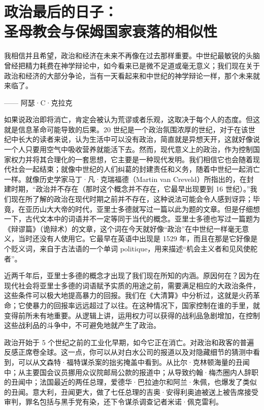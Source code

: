 \chapter[政治最后的日子]{政治最后的日子：\\ 圣母教会与保姆国家衰落的相似性}

\begin{tcolorbox}
我相信并且希望，政治和经济在未来不再像在过去那样重要。中世纪最敏锐的头脑曾经把精力耗费在神学辩论中，如今看来已是微不足道或毫无意义；我们现在关于政治和经济的大部分争论，当有一天看起来和中世纪的神学辩论一样，那个未来就来临了。
\begin{flushright}
—— 阿瑟·C·克拉克
\end{flushright}
\end{tcolorbox}

如果说政治即将消亡，肯定会被认为荒谬或者乐观，这取决于每个人的态度。但这就是信息革命可能导致的后果。20 世纪是一个政治氛围浓厚的世纪，对于在该世纪中长大的读者来说，认为生活中可以没有政治，简直就是异想天开，这就好像说一个人只要用空气中吸收营养就能活下去。然而，现代意义上的政治，作为控制国家权力并将其合理化的一套思想，它主要是一种现代发明。我们相信它也会随着现代社会一起结束；就像中世纪的人们纠葛的封建责任和义务，随着中世纪一起消亡一样。就像历史学家马丁·凡·克瑞福德（Martin van Creveld）所指出的，在封建时期，“政治并不存在（那时这个概念并不存在，它最早出现要到 16 世纪）。”我们现在所了解的政治在现代时期之前并不存在，这种说法可能会令人感到讶异；毕竟，在亚历山大大帝的时代，亚里士多德就写过一篇以此为题的文章。但是仔细想一下，古代文本中的词语并不一定等同于当代的概念。亚里士多德也写过一篇题为《辩谬篇》（诡辩术）的文章，这个词在今天就好像“政治”在中世纪一样毫无意义，当时还没有人使用它。它最早在英语中出现是 1529 年，而且在那是它好像是个贬义词，来自于古法语的一个单词 politique，用来描述“机会主义者和见风使舵者”。

近两千年后，亚里士多德的概念才出现了我们现在所知的内涵。原因何在？因为在现代社会将亚里士多德的词语赋予实质的用途之前，需要满足相应的大政治条件，这些条件可以极大地提高暴力的回报。我们在《大清算》中分析过，这就是火药革命；它使暴力的回报率远远超过了以往。在这种情况下，国家控制在谁的手里，就变得前所未有地重要。从逻辑上讲，运用权力可以获得的战利品急剧增加，在控制这些战利品的斗争中，不可避免地就产生了政治。

政治开始于 5 个世纪之前的工业化早期，如今它正在消亡。对政治和政客的普遍反感正席卷全球。这一点，你可以从对白水公司的报道以及对隐藏细节的猜测中看到，可以从文森特·福特谋杀案的拙劣掩盖中看到。从比尔·克林顿海量的丑闻中；从主要国会议员挪用众议院邮局公款的报道中；从导致约翰·梅杰圈内人辞职的丑闻中；法国最近的两任总理，爱德华·巴拉迪尔和阿兰·朱佩，也爆发了类似的丑闻。意大利，丑闻更大，做了七任总理的吉奥·安得利奥迪被送上被告席接受审判，罪名包括与黑手党有染，还下令谋杀调查记者米诺·佩克雷利。

